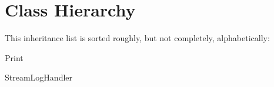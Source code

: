 \section{Class Hierarchy}
This inheritance list is sorted roughly, but not completely, alphabetically\+:\begin{DoxyCompactList}
\item Print\begin{DoxyCompactList}
\item {}
\end{DoxyCompactList}
\item Stream\+Log\+Handler\begin{DoxyCompactList}
\item {}
\end{DoxyCompactList}
\end{DoxyCompactList}
